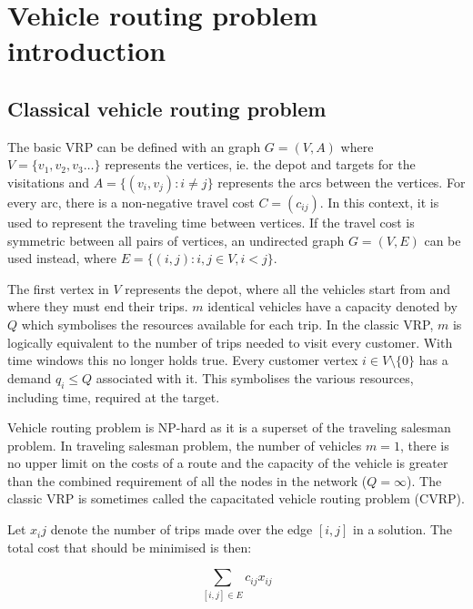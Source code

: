 \chapter{Vehicle routing problem introduction}
\label{chapter:background} 

\section{Classical vehicle routing problem}



The basic VRP can be defined with an graph $G = (V, A)$ where $V = \{v_1, v_2, v_3\dots\}$ represents the vertices, ie. the depot and targets for the visitations and $A = \{(v_i, v_j): i \neq j \}$ represents the arcs between the vertices. For every arc, there is a non-negative travel cost $C=(c_{ij})$. In this context, it is used to represent the traveling time between vertices. If the travel cost is symmetric between all pairs of vertices, an undirected graph $G = (V, E)$ can be used instead, where $E=\{(i, j) : i, j \in V, i < j\}$. \cite{laporte2007you}

The first vertex in $V$ represents the depot, where all the vehicles start from and where they must end their trips. $m$ identical vehicles have a capacity denoted by $Q$ which symbolises the resources available for each trip. In the classic VRP, $m$ is logically equivalent to the number of trips needed to visit every customer. With time windows this no longer holds true. Every customer vertex $i \in V\setminus\{0\}$ has a demand $q_i \leq Q$ associated with it. This symbolises the various resources, including time, required at the target. \cite{laporte2007you}

Vehicle routing problem is NP-hard as it is a superset of the traveling salesman problem. In traveling salesman problem, the number of vehicles $m = 1$, there is no upper limit on the costs of a route and the capacity of the vehicle is greater than the combined requirement of all the nodes in the network ($Q = \infty$). \cite{laporte2007you} The classic VRP is sometimes called the capacitated vehicle routing problem (CVRP). \cite{hassanzadeh2009location}

Let $x_ij$ denote the number of trips made over the edge $[i, j]$ in a solution. The total cost that should be minimised is then:

\begin{equation}
\label{eq:baseformula1}
\displaystyle \sum_{[i,j] \in E} c_{ij}x_{ij}
\end{equation}

